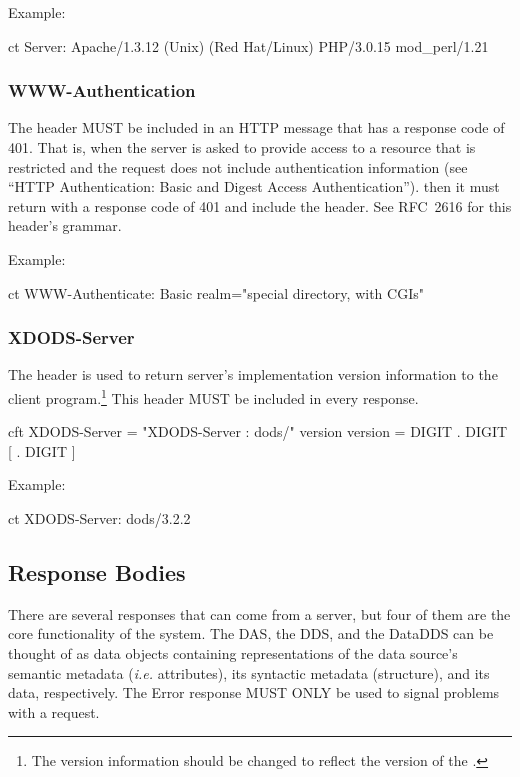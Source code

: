 \documentclass[justify]{nasa-ese}
\begin{document}
Example:

\begin{vcode}{ct}
Server: Apache/1.3.12 (Unix)  (Red Hat/Linux) PHP/3.0.15 mod_perl/1.21
\end{vcode}

\subsubsection{WWW-Authentication}
The  header MUST be included in an HTTP message
that has a response code of 401. That is, when the \DAP server is
asked to provide access to a resource that is restricted and the
request does not include authentication information (see ``HTTP
Authentication: Basic and Digest Access
Authentication''\cite{rfc2617}). then it must return with a response
code of 401 and include the  header. See
RFC~2616\cite{rfc2616} for this header's grammar.

Example:

\begin{vcode}{ct}
WWW-Authenticate: Basic realm="special directory, with CGIs"
\end{vcode}

\subsubsection{XDODS-Server}

The  header is used to return \DAP server's
implementation version information to the client program.\footnote{The
  version information should be changed to reflect the version of the
  \DAP.} This header MUST be included in every response.

\begin{vcode}{cft}
XDODS-Server = "XDODS-Server : dods/" version 
version      = DIGIT . DIGIT [ . DIGIT ]
\end{vcode}

Example:
\begin{vcode}{ct}
XDODS-Server: dods/3.2.2
\end{vcode}

\subsection{Response Bodies}
\label{sec-resp-bodies}

There are several responses that can come from a server, but four of them are
the core functionality of the system. The DAS, the DDS, and the DataDDS can
be thought of as data objects containing representations of the data source's
semantic metadata ({\it i.e.} attributes), its syntactic metadata
(structure), and its data, respectively. The Error response MUST ONLY be used
to signal problems with a request.
\end{document}
